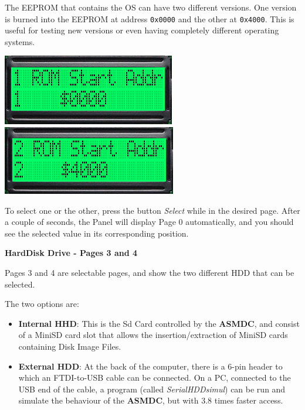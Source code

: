         The EEPROM that contains the OS can have two different versions. One
        version is burned into the EEPROM at address \texttt{0x0000} and the
        other at \texttt{0x4000}. This is useful for testing new versions or
        even having completely different operating systems.

        \begin{center}
            \includegraphics[scale=0.7]{images/dastaZ80_ControlPanel_Page1.png}
            \includegraphics[scale=0.7]{images/dastaZ80_ControlPanel_Page2.png}
        \end{center}

        To select one or the other, press the button \textit{Select} while in
        the desired page. After a couple of seconds, the Panel will display Page
        0 automatically, and you should see the selected value in its
        corresponding position.

        \textbf{HardDisk Drive - Pages 3 and 4}

        Pages 3 and 4 are selectable pages, and show the two different HDD that
        can be selected.

        The two options are:

        \begin{itemize}
            \item \textbf{Internal HHD}: This is the Sd Card controlled by the
                \textbf{ASMDC}, and consist of a MiniSD card slot that allows
                the insertion/extraction of MiniSD cards containing Disk Image
                Files.
            \item \textbf{External HDD}: At the back of the computer, there is a
                6-pin header to which an FTDI-to-USB cable can be connected. On
                a PC, connected to the USB end of the cable, a program (called
                \textit{SerialHDDsimul}) can be run and simulate the behaviour
                of the \textbf{ASMDC}, but with 3.8 times faster access.
        \end{itemize}

